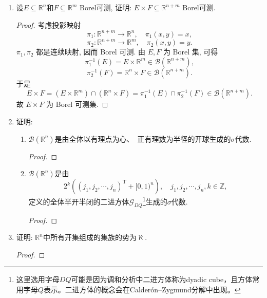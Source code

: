 \begin{quiza}
\begin{enumerate}
\begin{proof}
   2) \(A\times N_F\) 可测: 先证 \(\mathbb{R}^n\times N_F\) 零测度.
   对每个 \(\ell\in\mathbb{N}\), 设 \(Q_\ell=[-\ell,\ell]^n\), 则 \(|Q_\ell|<\infty\).
   由于 \(m(N_F)=0\), 对任意 \(\eta>0\), 可取开集 \(U\supset N_F\) 使
   \(m(U)<\eta/|Q_\ell|\). 于是
   \[Q_\ell\times N_F\subset Q_\ell\times U,
   \qquad m(Q_\ell\times U)=|Q_\ell|\,m(U)<\eta.\]
   故 \(m(Q_\ell\times N_F)=0\). 再由
   \(\mathbb{R}^n\times N_F=\bigcup_{\ell=1}^{\infty}(Q_\ell\times N_F)\),
   得 \(\mathbb{R}^n\times N_F\) 为零测度集. 从而
   \(A\times N_F\subset \mathbb{R}^n\times N_F\) 亦可测.
	
   同理, \(N_E\times C\subset N_E\times\mathbb{R}^m\) 可测, 且
   \(N_E\times N_F\subset N_E\times\mathbb{R}^m\) 可测.
	
   综上, \(E\times F\) 为可测集.
\end{proof}

\item 设\(E\subseteq\mathbb{R}^n\)和\(F\subseteq\mathbb{R}^m\) Borel可测, 
证明: \(E\times F\subseteq\mathbb{R}^{n+m}\) Borel可测.
\begin{proof}
	考虑投影映射
   \[\pi_1:\mathbb{R}^{n+m}\to\mathbb{R}^n,\quad \pi_1(x,y)=x,\]
   \[\pi_2:\mathbb{R}^{n+m}\to\mathbb{R}^m,\quad \pi_2(x,y)=y.\]
   \(\pi_1,\pi_2\) 都是连续映射, 因而 Borel 可测. 由 \(E,F\) 为 Borel 集,
   可得
   \[\pi_1^{-1}(E)=E\times\mathbb{R}^m\in\mathcal{B}(\mathbb{R}^{n+m}),\]
   \[\pi_2^{-1}(F)=\mathbb{R}^n\times F\in\mathcal{B}(\mathbb{R}^{n+m}).\]
   于是
   \[E\times F=(E\times\mathbb{R}^m)\cap(\mathbb{R}^n\times F)
   =\pi_1^{-1}(E)\cap\pi_2^{-1}(F)
   \in\mathcal{B}(\mathbb{R}^{n+m}).\]
   故 \(E\times F\) 为 Borel 可测集.
\end{proof}

\item 证明:\begin{enumerate}[label=(\roman*)]
\item \(\mathscr{B}(\mathbb{R}^n)\)是由全体以有理点为心、\ 正有理数为半径的开球生成的\(\sigma\)代数.
\begin{proof}
	
\end{proof}
\item \(\mathscr{B}(\mathbb{R}^n)\)是由
\[2^k\left(\left(j_1,j_2,\cdots,j_n\right)^\mathrm{T}+[0,1)^n\right),\quad j_1,j_2,\cdots,j_n,k\in\mathbb{Z},\]
定义的全体半开半闭的二进方体\(\mathscr{G}_{DQ}\)\footnote{这里选用字母$DQ$可能是因为调和分析中二进方体称为dyadic cube，且方体常用字母$Q$表示。二进方体的概念会在Calderón--Zygmund分解中出现。}生成的\(\sigma\)代数.
\printfootnotes
\begin{proof}
	
\end{proof}
\end{enumerate}
\item 证明: \(\mathbb{R}^n\)中所有开集组成的集族的势为\(\aleph\).
\begin{proof}
	
\end{proof}
\end{enumerate}
\end{quiza}

